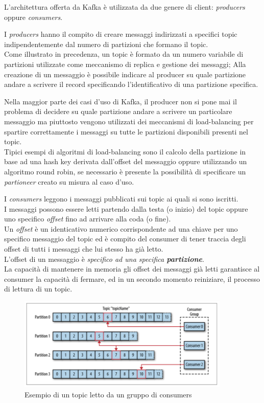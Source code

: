 \documentclass[]{article}
\begin{document}
L'architettura offerta da Kafka è utilizzata da due genere di client:
\emph{producers} oppure \emph{consumers}.

I \emph{producers} hanno il compito di creare messaggi indirizzati a
specifici topic indipendentemente dal numero di partizioni che formano
il topic.\\
Come illustrato in precedenza, un topic è formato da un numero variabile
di partizioni utilizzate come meccanismo di replica e gestione dei
messaggi; Alla creazione di un messaggio è possibile indicare al
producer su quale partizione andare a scrivere il record specificando
l'identificativo di una partizione specifica.

Nella maggior parte dei casi d'uso di Kafka, il producer non si pone mai
il problema di decidere su quale partizione andare a scrivere un
particolare messaggio ma piuttosto vengono utilizzati dei meccanismi di
load-balancing per spartire correttamente i messaggi su tutte le
partizioni disponibili presenti nel topic.\\
Tipici esempi di algoritmi di load-balancing sono il calcolo della
partizione in base ad una hash key derivata dall'offset del messaggio
oppure utilizzando un algoritmo round robin, se necessario è presente la
possibilità di specificare un \emph{partioneer} creato su misura al caso
d'uso.

I \emph{consumers} leggono i messaggi pubblicati sui topic ai quali si
sono iscritti.\\
I messaggi possono essere letti partendo dalla testa (o inizio) del
topic oppure uno specifico \emph{offset} fino ad arrivare alla coda (o
fine).\\
Un \emph{offset} è un identicativo numerico corrispondente ad una chiave
per uno specifico messaggio del topic ed è compito del consumer di tener
traccia degli offset di tutti i messaggi che lui stesso ha già letto.\\
L'offset di un messaggio è \emph{specifico ad una specifica
\textbf{partizione}}.\\
La capacità di mantenere in memoria gli offset dei messaggi già letti
garantisce al consumer la capacità di fermare, ed in un secondo momento
reiniziare, il processo di lettura di un topic.

\begin{figure}
\centering
\includegraphics[width=0.90000\textwidth]{../images/topic-and-consumers.png}
\caption{Esempio di un topic letto da un gruppo di consumers
\label{figure_3}}
\end{figure}
\end{document}
